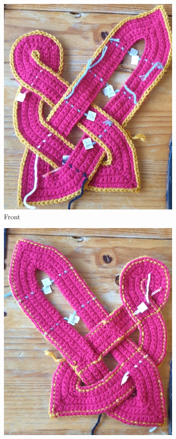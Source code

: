 \documentclass[openany]{book}
\begin{document}
\begin{figure}[H]\centering
\begin{subfigure}[t]{.45\textwidth}\centering
\includegraphics[width=.95\textwidth]{bk/weave3}
\caption{Front}
\end{subfigure}
%
\begin{subfigure}[t]{.45\textwidth}
		\centering
		\includegraphics[width=.95\textwidth]{bk/weave4}

\end{subfigure}
\end{figure}
\end{document}
